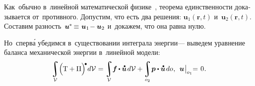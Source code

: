 \begin{otherlanguage}{russian}

Как~обычно в~линейной математической физике~\cite{lurie-theoryofelasticity, tihonovsamarsky-mathphysicsequations}, теорема единственности доказывается от~противного. Допустим, что есть два решения: ${\bm{u}_1 (\bm{r}, t)}$ и~${\bm{u}_2 (\bm{r}, t)}$. Составим разность~${\bm{u}^{\hspace{-0.1ex}*} \hspace{-0.2ex} \equiv \hspace{0.12ex} \bm{u}_1 \hspace{-0.32ex} - \bm{u}_2}$ и~докажем, что она равна нулю.

Но~сперв\'{а} убедимся в~существовании интеграла энергии\:--- выведем уравнение баланса механической энергии в~линейной модели:
\begin{equation}\label{dynamicsoflineartheory:integralofenergy}
\integral\displaylimits_{\mathcal{V}} \hspace{-0.42ex} \left(^{\mathstrut} \hspace{-0.2ex} \mathrm{T} + \Pi \right)^{\hspace{-0.12em}\tikz[baseline=-0.2ex] \draw[black, fill=black] (0,0) circle (.28ex);} \hspace{-0.25ex} d\mathcal{V} \hspace{.1ex} =
\integral\displaylimits_{\mathcal{V}} \hspace{-0.5ex} \bm{f} \hspace{-0.1ex} \dotp \mathdotabove{\bm{u}} \hspace{0.25ex} d\mathcal{V} + \hspace{-0.12ex}
\integral\displaylimits_{o_2} \hspace{-0.32ex} \bm{p} \dotp \mathdotabove{\bm{u}} \hspace{0.25ex} do \hspace{.1ex}, \:\:
\bm{u} \hspace{0.1ex} \bigr|_{o_1} \hspace{-0.64ex} = \hspace{0.2ex} 0 \hspace{.1ex}.
\end{equation}


\end{otherlanguage}
